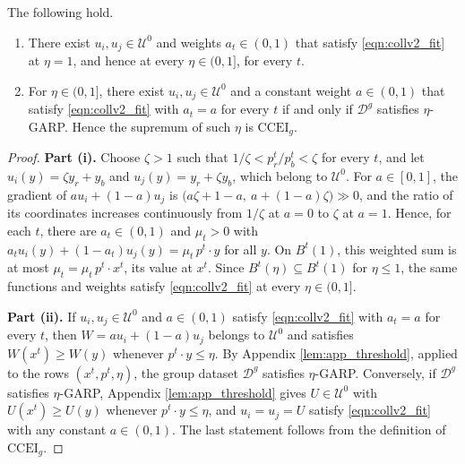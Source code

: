 \documentclass[11 pt]{article}
\begin{document}
\begin{proposition}\label{prop:app_unrestricted}
The following hold.
\begin{enumerate}
\item[(i)] There exist $u_{i}, u_{j} \in \mathcal{U}^{0}$ and weights $a_{t} \in (0,1)$ that satisfy \eqref{eqn:collv2_fit} at $\eta = 1$, and hence at every $\eta \in (0,1]$, for every $t$.
\item[(ii)] For $\eta \in (0,1]$, there exist $u_{i}, u_{j} \in \mathcal{U}^{0}$ and a constant weight $a \in (0,1)$ that satisfy \eqref{eqn:collv2_fit} with $a_{t} = a$ for every $t$ if and only if $\mathcal{D}^{g}$ satisfies $\eta$-GARP. Hence the supremum of such $\eta$ is $\mathrm{CCEI}_{g}$.
\end{enumerate}
\end{proposition}

\begin{proof}
\textbf{Part (i).} Choose $\zeta > 1$ such that $1/\zeta < p^{t}_{r}/p^{t}_{b} < \zeta$ for every $t$, and let $u_{i}(y) = \zeta y_{r} + y_{b}$ and $u_{j}(y) = y_{r} + \zeta y_{b}$, which belong to $\mathcal{U}^{0}$. For $a \in [0,1]$, the gradient of $a u_{i} + (1-a) u_{j}$ is $\bigl( a \zeta + 1 - a,\ a + (1-a) \zeta \bigr) \gg 0$, and the ratio of its coordinates increases continuously from $1/\zeta$ at $a = 0$ to $\zeta$ at $a = 1$. Hence, for each $t$, there are $a_{t} \in (0,1)$ and $\mu_{t} > 0$ with $a_{t} u_{i}(y) + (1-a_{t}) u_{j}(y) = \mu_{t}\, p^{t} \cdot y$ for all $y$. On $B^{t}(1)$, this weighted sum is at most $\mu_{t} = \mu_{t}\, p^{t} \cdot x^{t}$, its value at $x^{t}$. Since $B^{t}(\eta) \subseteq B^{t}(1)$ for $\eta \leq 1$, the same functions and weights satisfy \eqref{eqn:collv2_fit} at every $\eta \in (0,1]$.

\textbf{Part (ii).} If $u_{i}, u_{j} \in \mathcal{U}^{0}$ and $a \in (0,1)$ satisfy \eqref{eqn:collv2_fit} with $a_{t} = a$ for every $t$, then $W = a u_{i} + (1-a) u_{j}$ belongs to $\mathcal{U}^{0}$ and satisfies $W(x^{t}) \geq W(y)$ whenever $p^{t} \cdot y \leq \eta$. By Appendix \autoref{lem:app_threshold}, applied to the rows $(x^{t}, p^{t}, \eta)$, the group dataset $\mathcal{D}^{g}$ satisfies $\eta$-GARP. Conversely, if $\mathcal{D}^{g}$ satisfies $\eta$-GARP, Appendix \autoref{lem:app_threshold} gives $U \in \mathcal{U}^{0}$ with $U(x^{t}) \geq U(y)$ whenever $p^{t} \cdot y \leq \eta$, and $u_{i} = u_{j} = U$ satisfy \eqref{eqn:collv2_fit} with any constant $a \in (0,1)$. The last statement follows from the definition of $\mathrm{CCEI}_{g}$.
\end{proof}
\end{document}
